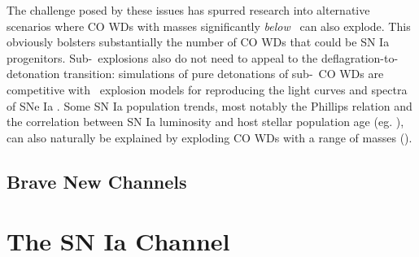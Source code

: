 

The challenge posed by these issues has spurred research into alternative scenarios where CO WDs with masses significantly \textit{below} \Mch\ can also explode.  This obviously bolsters substantially the number of CO WDs that could be SN Ia progenitors.  Sub-\Mch\ explosions also do not need to appeal to the deflagration-to-detonation transition: simulations of pure detonations of sub-\Mch\ CO WDs \citep{shig+92, sim+10} are competitive with \Mch\ explosion models for reproducing the light curves and spectra of SNe Ia \citep{none}.  Some SN Ia population trends, most notably the Phillips relation and the correlation between SN Ia luminosity and host stellar population age (eg. \cite{none}), can also naturally be explained by exploding CO WDs with a range of masses (\citeal{vkercj10}).

\subsection{Brave New Channels}

\section{The \citeal{vkercj10} SN Ia Channel}


